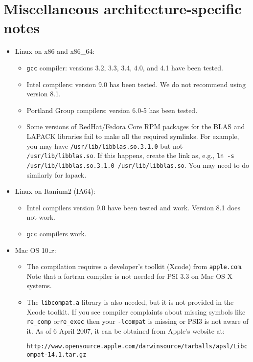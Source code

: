 \documentclass[12pt]{article}
\begin{document}
\section{Miscellaneous architecture-specific notes}
\begin{itemize}

\item Linux on x86 and x86\_64:
  \begin{itemize}
   \item {\tt gcc} compiler: versions 3.2, 3.3, 3.4, 4.0, and 4.1 have been tested.
   \item Intel compilers: version 9.0 has been tested. We do not recommend
   using version 8.1.
   \item Portland Group compilers: version 6.0-5 has been tested.
   \item Some versions of RedHat/Fedora Core RPM packages for the 
   BLAS and LAPACK libraries fail to make all the required symlinks.  
   For example, you may have {\tt /usr/lib/libblas.so.3.1.0} but not
   {\tt /usr/lib/libblas.so}.  If this happens, create the link as, e.g.,
   {\tt ln -s /usr/lib/libblas.so.3.1.0 /usr/lib/libblas.so}.  You
   may need to do similarly for lapack.
  \end{itemize}

\item Linux on Itanium2 (IA64):
  \begin{itemize}
   \item Intel compilers version 9.0 have been tested and work. Version 8.1
   does not work.
   \item {\tt gcc} compilers work.
  \end{itemize}

\item Mac OS 10.$x$:

  \begin{itemize}
  \item The compilation requires a developer's toolkit (Xcode) from
    {\tt apple.com}.  Note that a fortran compiler is not needed for
    PSI 3.3 on Mac OS X systems.

  \item The {\tt libcompat.a} library is also needed, but it is not
    provided in the Xcode toolkit. If you see compiler complaints
    about missing symbols like {\tt re\_comp} or{\tt re\_exec} then your
    {\tt -lcompat} is missing or PSI3 is not aware of it.  As of 6
    April 2007, it can be obtained from Apple's website at:

{\tt http://www.opensource.apple.com/darwinsource/tarballs/apsl/Libcompat-14.1.tar.gz}


\end{itemize}
\end{itemize}
\end{document}
